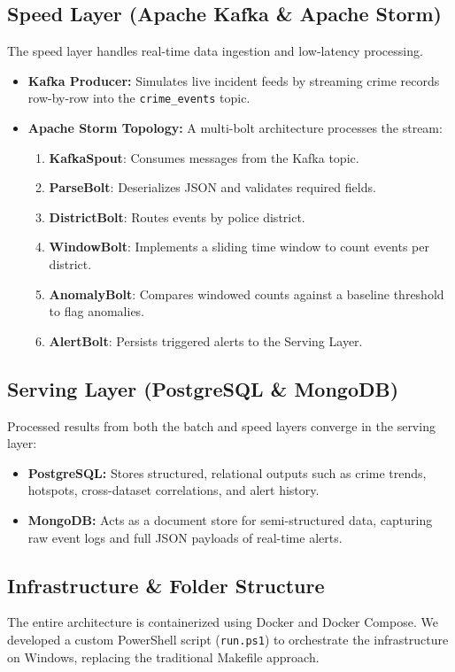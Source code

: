 \documentclass[12pt]{article}
\begin{document}
\subsection{Speed Layer (Apache Kafka \& Apache Storm)}
The speed layer handles real-time data ingestion and low-latency processing.
\begin{itemize}
    \item \textbf{Kafka Producer:} Simulates live incident feeds by streaming crime records row-by-row into the \texttt{crime\_events} topic.
    \item \textbf{Apache Storm Topology:} A multi-bolt architecture processes the stream:
    \begin{enumerate}
        \item \textbf{KafkaSpout}: Consumes messages from the Kafka topic.
        \item \textbf{ParseBolt}: Deserializes JSON and validates required fields.
        \item \textbf{DistrictBolt}: Routes events by police district.
        \item \textbf{WindowBolt}: Implements a sliding time window to count events per district.
        \item \textbf{AnomalyBolt}: Compares windowed counts against a baseline threshold to flag anomalies.
        \item \textbf{AlertBolt}: Persists triggered alerts to the Serving Layer.
    \end{enumerate}
\end{itemize}

\subsection{Serving Layer (PostgreSQL \& MongoDB)}
Processed results from both the batch and speed layers converge in the serving layer:
\begin{itemize}
    \item \textbf{PostgreSQL:} Stores structured, relational outputs such as crime trends, hotspots, cross-dataset correlations, and alert history.
    \item \textbf{MongoDB:} Acts as a document store for semi-structured data, capturing raw event logs and full JSON payloads of real-time alerts.
\end{itemize}

\subsection{Infrastructure \& Folder Structure}
The entire architecture is containerized using Docker and Docker Compose. We developed a custom PowerShell script (\texttt{run.ps1}) to orchestrate the infrastructure on Windows, replacing the traditional Makefile approach.
\end{document}
